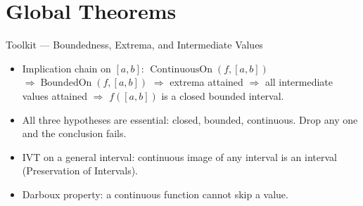 
\section{Global Theorems}

\begin{toolkitbox}{Toolkit --- Boundedness, Extrema, and Intermediate Values}
\begin{itemize}
  \item Implication chain on $[a,b]$:
    $\operatorname{ContinuousOn}(f,[a,b])$
    $\Rightarrow\operatorname{BoundedOn}(f,[a,b])$
    $\Rightarrow$ extrema attained
    $\Rightarrow$ all intermediate values attained
    $\Rightarrow$ $f([a,b])$ is a closed bounded interval.
  \item All three hypotheses are essential: closed, bounded, continuous.
    Drop any one and the conclusion fails.
  \item IVT on a general interval: continuous image of any interval
    is an interval (Preservation of Intervals).
  \item Darboux property: a continuous function cannot skip a value.
\end{itemize}
\end{toolkitbox}



